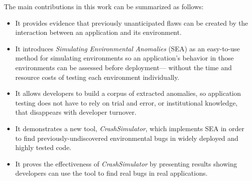 The main contributions in this work can be summarized as follows:

\begin{itemize}

\item{It provides evidence
that previously unanticipated flaws can be created by the interaction
between an application and its environment.}

\item{It introduces \textit{Simulating Environmental Anomalies} (SEA)
as an easy-to-use method for simulating environments
so an application's behavior in those environments
can be assessed before deployment---
without the time and resource costs of
testing each environment individually.}

\item{It allows developers to build a corpus of extracted anomalies, so
    application testing does not have to rely on trial and error,
    or institutional knowledge,
    that disappears with developer turnover.}

\item{It demonstrates a new tool, {\em CrashSimulator},
which implements SEA
in order to find previously-undiscovered environmental bugs
in widely deployed and highly tested code.}

\item{It proves the effectiveness
of {\em CrashSimulator}
by presenting results
showing developers
can use the tool to find real bugs in real applications.}

\end{itemize}
